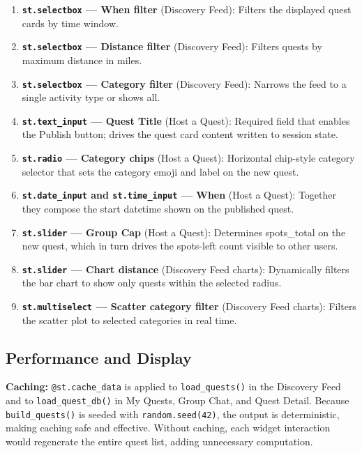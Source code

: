 \documentclass[11pt]{article}
\begin{document}
\begin{enumerate}
    \item \textbf{\texttt{st.selectbox} --- When filter} (Discovery Feed): Filters the displayed quest cards by time window.
    \item \textbf{\texttt{st.selectbox} --- Distance filter} (Discovery Feed): Filters quests by maximum distance in miles.
    \item \textbf{\texttt{st.selectbox} --- Category filter} (Discovery Feed): Narrows the feed to a single activity type or shows all.
    \item \textbf{\texttt{st.text\_input} --- Quest Title} (Host a Quest): Required field that enables the Publish button; drives the quest card content written to session state.
    \item \textbf{\texttt{st.radio} --- Category chips} (Host a Quest): Horizontal chip-style category selector that sets the category emoji and label on the new quest.
    \item \textbf{\texttt{st.date\_input} and \texttt{st.time\_input} --- When} (Host a Quest): Together they compose the start datetime shown on the published quest.
    \item \textbf{\texttt{st.slider} --- Group Cap} (Host a Quest): Determines spots\_total on the new quest, which in turn drives the spots-left count visible to other users.
    \item \textbf{\texttt{st.slider} --- Chart distance} (Discovery Feed charts): Dynamically filters the bar chart to show only quests within the selected radius.
    \item \textbf{\texttt{st.multiselect} --- Scatter category filter} (Discovery Feed charts): Filters the scatter plot to selected categories in real time.
\end{enumerate}

\subsection{Performance and Display}

\textbf{Caching:} \texttt{@st.cache\_data} is applied to \texttt{load\_quests()} in the Discovery Feed and to \texttt{load\_quest\_db()} in My Quests, Group Chat, and Quest Detail. Because \texttt{build\_quests()} is seeded with \texttt{random.seed(42)}, the output is deterministic, making caching safe and effective. Without caching, each widget interaction would regenerate the entire quest list, adding unnecessary computation.
\end{document}
